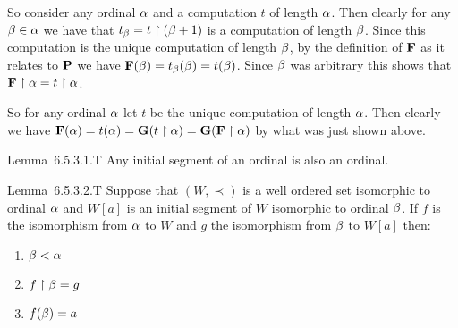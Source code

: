 \begin{questions}
\begin{solution}
    So consider any ordinal $\a$ and a computation $t$ of length $\a$.
    Then clearly for any $\b \in \a$ we have that $t_\b = t \rest (\b+1)$ is a computation of length $\b$.
    Since this computation is the unique computation of length $\b$, by the definition of $\F$ as it relates to $\P$ we have $\F(\b) = t_\b(\b) = t(\b)$.
    Since $\b$ was arbitrary this shows that $\F \rest \a = t \rest \a$.
    
    So for any ordinal $\a$ let $t$ be the unique computation of length $\a$.
    Then clearly we have $\F(\a) = t(\a) = \G(t \rest \a) = \G(\F \rest \a)$ by what was just shown above. \qedsymbol
\end{solution}


\begin{solution}
    \begin{statement}{Lemma~6.5.3.1.T}
        Any initial segment of an ordinal is also an ordinal.
    \end{statement}

    
    \begin{statement}{Lemma~6.5.3.2.T}
        Suppose that $(W, \prec)$ is a well ordered set isomorphic to ordinal $\a$ and $W[a]$ is an initial segment of $W$ isomorphic to ordinal $\b$.
        If $f$ is the isomorphism from $\a$ to $W$ and $g$ the isomorphism from $\b$ to $W[a]$ then:
        \begin{enumerate}
            \item $\b < \a$
            \item $f \rest \b = g$
            \item $f(\b) = a$
        \end{enumerate}
    \end{statement}


\end{solution}
\end{questions}
